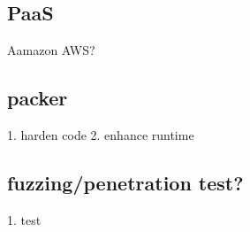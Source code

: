 \documentclass[conference]{IEEEtran}
\begin{document}
\subsection{PaaS}
Aamazon AWS?

\subsection{packer}
1. harden code
2. enhance runtime

\subsection{fuzzing/penetration test?}
1. test




\end{document}
